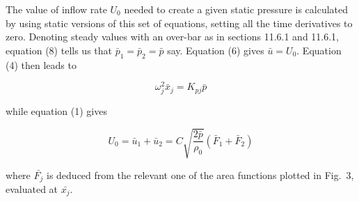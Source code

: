   The value of inflow rate $U_0$ needed to create a given static pressure is 
  calculated by using static versions of this set of equations, setting all the 
  time derivatives to zero. Denoting steady values with an over-bar as in 
  sections 11.6.1 and 11.6.1, equation (8) tells us that 
  $\bar{p}_1=\bar{p}_2=\bar{p}$ say. Equation (6) gives $\bar{u}=U_0$. Equation 
  (4) then leads to 

  $$\omega_j^2 \bar{x}_j=K_{pj} \bar{p} \tag{11}$$ 

  while equation (1) gives 

  $$U_0=\bar{u}_1+\bar{u}_2= C \sqrt{\dfrac{2 \bar{p}}{\rho_0}} 
  (\bar{F}_1+\bar{F}_2) \tag{12}$$ 

  where $\bar{F_j}$ is deduced from the relevant one of the area functions 
  plotted in Fig.\ 3, evaluated at $\bar{x_j}$. 